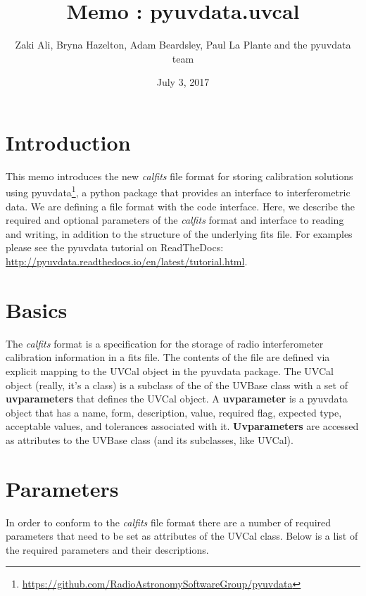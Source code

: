 \documentclass[11pt, oneside]{article}   	%
\title{Memo : pyuvdata.uvcal}
\author{Zaki Ali, Bryna Hazelton, Adam Beardsley, Paul La Plante and the pyuvdata team}
\date{July 3, 2017}							%
\begin{document}
\maketitle
\section{Introduction}
This memo introduces the new \textit{calfits} file format for storing
calibration solutions using
pyuvdata\footnote{\url{https://github.com/RadioAstronomySoftwareGroup/pyuvdata}}, a python package that
provides an interface to interferometric data. We are defining a file format
with the code interface. Here, we describe the required and optional parameters
of the \textit{calfits} format and interface to reading and writing, in addition
to the structure of the underlying fits file. For examples please see the
pyuvdata tutorial on ReadTheDocs: \url{http://pyuvdata.readthedocs.io/en/latest/tutorial.html}.

\section{Basics}

The \textit{calfits} format is a specification for the storage of radio
interferometer calibration information in a fits file.  The contents of the file
are defined via explicit mapping to the UVCal object in the pyuvdata package.
The UVCal object (really, it's a class) is a subclass of the of the UVBase class
with a set of \textbf{uvparameters} that defines the UVCal object. A
\textbf{uvparameter} is a pyuvdata object that has a name, form, description,
value, required flag, expected type, acceptable values, and tolerances
associated with it.  \textbf{Uvparameters} are accessed as attributes to the
UVBase class (and its subclasses, like UVCal).

\section{Parameters}
In order to conform to the \textit{calfits} file format there are a number of
required parameters that need to be set as attributes of the UVCal class. Below
is a list of the required parameters and their descriptions.
\end{document}
